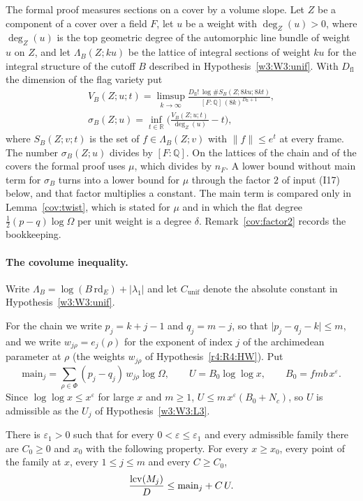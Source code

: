 The formal proof measures sections on a cover by a volume slope. Let $Z$ be a component of a cover over a field $F$, let $u$ be a weight with $\deg_Z(u)>0$, where $\deg_Z(u)$ is the top geometric degree of the automorphic line bundle of weight $u$ on $Z$, and let $\Lambda_B(Z;ku)$ be the lattice of integral sections of weight $ku$ for the integral structure of the cutoff $B$ described in Hypothesis~\ref{w3:W3:unif}. With $D_{\mathrm{fl}}$ the dimension of the flag variety put
\begin{gather*}
V_B(Z;u;t)=\limsup_{k\to\infty}\frac{D_{\mathrm{fl}}!\,\log\#S_B(Z;8ku;8kt)}{[F:\mathbb Q]\,(8k)^{D_{\mathrm{fl}}+1}},\\
\sigma_B(Z;u)=\inf_{t\in\mathbb R}\Big(\frac{V_B(Z;u;t)}{\deg_Z(u)}-t\Big),
\end{gather*}
where $S_B(Z;v;t)$ is the set of $f\in\Lambda_B(Z;v)$ with $\lVert f\rVert\le e^{t}$ at every frame.
The number $\sigma_B(Z;u)$ divides by $[F:\mathbb Q]$. On the lattices of the chain and of the covers the formal proof uses $\mu$, which divides by $n_F$. A lower bound without main term for $\sigma_B$ turns into a lower bound for $\mu$ through the factor $2$ of input (I17) below, and that factor multiplies a constant. The main term is compared only in Lemma~\ref{cov:twist}, which is stated for $\mu$ and in which the flat degree $\frac12(p-q)\log\Omega$ per unit weight is a degree $\delta$. Remark~\ref{cov:factor2} records the bookkeeping.

\paragraph{The covolume inequality.}
Write $\Lambda_B=\log(B\,\mathrm{rd}_E)+|\lambda_1|$ and let $C_{\mathrm{unif}}$ denote the absolute constant in Hypothesis~\ref{w3:W3:unif}.

For the chain we write $p_j=k+j-1$ and $q_j=m-j$, so that $\lvert p_j-q_j-k\rvert\le m$, and we write $w_{j\rho}=e_{j}(\rho)$ for the exponent of index $j$ of the archimedean parameter at $\rho$ (the weights $w_{j\rho}$ of Hypothesis~\ref{r4:R4:HW}). Put
\[
\mathrm{main}_j=\sum_{\rho\in\Phi}(p_j-q_j)\,w_{j\rho}\log\Omega,\qquad U=B_0\log\log x,\qquad B_0=fmb\,x^\varepsilon .
\]
Since $\log\log x\le x^\varepsilon$ for large $x$ and $m\ge1$, $U\le m\,x^\varepsilon(B_0+N_c)$, so $U$ is admissible as the $U_j$ of Hypothesis~\ref{w3:W3:L3}.

\begin{hypothesis}\label{cov:H58}
There is $\varepsilon_1>0$ such that for every $0<\varepsilon\le\varepsilon_1$ and every admissible family there are $C_0\ge0$ and $x_0$ with the following property. For every $x\ge x_0$, every point of the family at $x$, every $1\le j\le m$ and every $C\ge C_0$,
\[
\frac{\operatorname{lcv}(M_j)}D\le\mathrm{main}_j+C\,U .
\]
\end{hypothesis}

